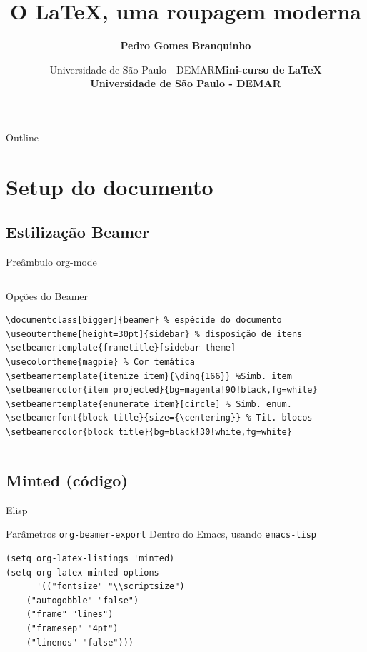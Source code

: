 \documentclass[bigger]{beamer}
\date{  Universidade de São Paulo - DEMAR}
\title{O \LaTeX{}, uma roupagem moderna}
\author[Branquinho]{\textbf{Pedro Gomes Branquinho \\ \text{\scriptsize{pedro.branquinho@usp.br}}}}
\date[EEL-USP]{\textbf{\scriptsize{Mini-curso de \LaTeX} \\ Universidade de São Paulo - DEMAR}}
\begin{document}
\maketitle
\begin{frame}{Outline}
\tableofcontents
\end{frame}



\section{Setup do documento}
\label{sec:org6d33ba4}
{
\subsection{Estilização Beamer}
\label{sec:orgfc73cea}
\begin{frame}[label={sec:org26015a1},fragile]{Preâmbulo org-mode}
 \begin{columns}
\begin{column}{0.92\columnwidth}
\begin{block}{Opções do Beamer}
\begin{verbatim}
\documentclass[bigger]{beamer} % espécide do documento
\useoutertheme[height=30pt]{sidebar} % disposição de itens
\setbeamertemplate{frametitle}[sidebar theme]
\usecolortheme{magpie} % Cor temática
\setbeamertemplate{itemize item}{\ding{166}} %Simb. item
\setbeamercolor{item projected}{bg=magenta!90!black,fg=white}
\setbeamertemplate{enumerate item}[circle] % Simb. enum.
\setbeamerfont{block title}{size={\centering}} % Tit. blocos
\setbeamercolor{block title}{bg=black!30!white,fg=white}
\end{verbatim}
\end{block}
\end{column}
\end{columns}
\end{frame}

\subsection{Minted (código)}
\label{sec:org9ad9943}
\begin{frame}[label={sec:org574e8a9},fragile]{Elisp}
 \begin{block}{Parâmetros \texttt{org-beamer-export}}
Dentro do Emacs, usando \texttt{emacs-lisp}
\begin{verbatim}
(setq org-latex-listings 'minted)
(setq org-latex-minted-options
      '(("fontsize" "\\scriptsize")
	("autogobble" "false")
	("frame" "lines")
	("framesep" "4pt")
	("linenos" "false")))
\end{verbatim}
\end{block}
\end{frame}

}
\end{document}
